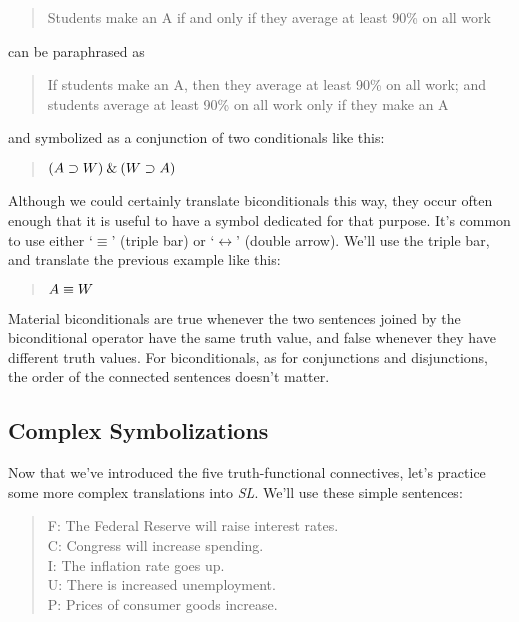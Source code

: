 \documentclass[../logic-text.tex]{subfiles}
\begin{document}
\begin{quote}
  Students make an A if and only if they average at least 90\% on all work
\end{quote}

\noindent can be paraphrased as

\begin{quote}
If students make an A, then they average at least 90\% on all work; and students average at least 90\% on all work only if they make an A
\end{quote}

\noindent and symbolized as a conjunction of two conditionals like this:

\begin{quote}
  \((A \supset W) \mathbin{\&} (W \supset A)\)
\end{quote}

Although we could certainly translate biconditionals this way, they occur often enough that it is useful to have a symbol dedicated for that purpose. It's common to use either  \enquote*{\(\equiv\)} (triple bar) or \enquote*{\(\leftrightarrow\)} (double arrow). We'll use the triple bar, and translate the previous example like this:

\begin{quote}
  \(A \equiv W\)
\end{quote}

Material biconditionals are true whenever the two sentences joined by the biconditional operator have the same truth value, and false whenever they have different truth values. For biconditionals, as for conjunctions and disjunctions, the order of the connected sentences doesn't matter.

\subsection{Complex Symbolizations}
\label{sec:compl-symb}

Now that we've introduced the five truth-functional connectives, let's practice some more complex translations into \emph{SL}.
We'll use these simple sentences:

\begin{quote}
  F: The Federal Reserve will raise interest rates.\\
  C: Congress will increase spending.\\
  I: The inflation rate goes up.\\
  U: There is increased unemployment.\\
  P: Prices of consumer goods increase.
\end{quote}
\end{document}
